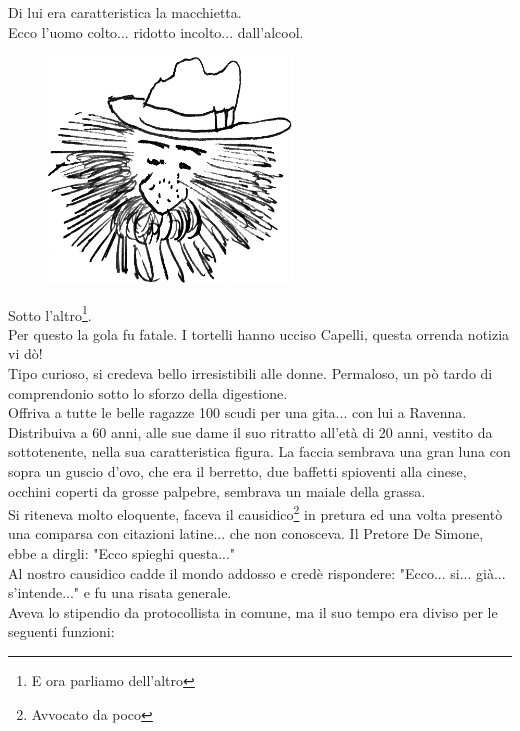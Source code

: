 \documentclass[10pt]{memoir} %
\begin{document}
\normalfont \normalsize
\noindent Di lui era caratteristica la macchietta.\\
Ecco l'uomo colto... ridotto incolto... dall'alcool.
 \begin{figure}[htb]
    \centering
    \includegraphics[height=6cm]{Capelli_Avvocato}
\end{figure}\newpage
{}
\noindent Sotto l'altro\footnote{E ora parliamo dell'altro}. \\Per questo la gola fu fatale. I tortelli hanno ucciso Capelli, questa orrenda notizia vi dò!\\
Tipo curioso, si credeva bello irresistibili alle donne. Permaloso, un pò tardo di comprendonio sotto lo sforzo della digestione.\\
Offriva a tutte le belle ragazze 100 scudi per una gita... con lui a Ravenna. Distribuiva a 60 anni, alle sue dame il suo ritratto all'età di 20 anni, vestito da sottotenente, nella sua caratteristica figura. La faccia sembrava una gran luna con sopra un guscio d'ovo, che era il berretto, due baffetti spioventi alla cinese, occhini coperti da grosse palpebre, sembrava un maiale della grassa. \\
Si riteneva molto eloquente, faceva il causidico\footnote{Avvocato da poco} in pretura ed una volta presentò una comparsa con citazioni latine... che non conosceva. Il Pretore De Simone, ebbe a dirgli: "Ecco spieghi questa..."\\
Al nostro causidico cadde il mondo addosso e credè rispondere: "Ecco... si... già... s'intende..." e fu una risata generale.\\
Aveva lo stipendio da protocollista in comune, ma il suo tempo era diviso per le seguenti funzioni:\\
\end{document}

